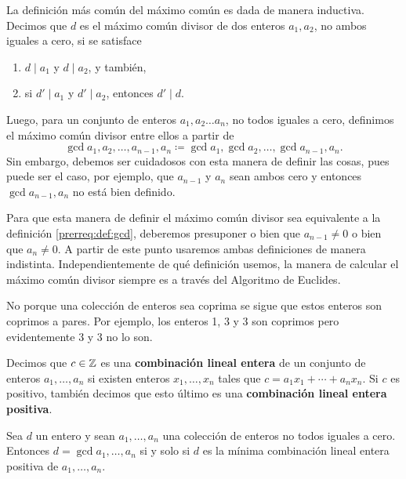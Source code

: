 La definición más común del máximo común es dada de manera inductiva. Decimos que $d$ es el máximo
común divisor de dos enteros $a_1, a_2$, no ambos iguales a cero, si se satisface
\begin{enumerate}
	\item $d \mid a_1$ y $d \mid a_2$, y también,
	\item si $d' \mid a_1$ y $d' \mid a_2$, entonces $d' \mid d$.
\end{enumerate}
Luego, para un conjunto de enteros $a_1, a_2 \ldots a_n$, no todos iguales a cero, definimos el máximo común
divisor entre ellos a partir de
\begin{equation*}
	\gcd{a_1, a_2, \ldots, a_{n-1}, a_n} \coloneq \gcd{a_1, \gcd{a_2, \ldots, \gcd{a_{n-1}, a_n}}}.
\end{equation*}
Sin embargo, debemos ser cuidadosos con esta manera de definir las cosas, pues puede ser el caso,
por ejemplo, que $a_{n-1}$ y $a_n$ sean ambos cero y entonces $\gcd{a_{n-1}, a_n}$ no está bien definido.

Para que esta manera de definir el máximo común divisor sea equivalente a la definición
\ref{prerreq:def:gcd}, deberemos presuponer o bien que $a_{n - 1} \neq 0$ o bien que $a_n \neq 0$. A
partir de este punto usaremos ambas definiciones de manera indistinta. Independientemente de qué
definición usemos, la manera de calcular el máximo común divisor siempre es a través del Algoritmo
de Euclides.

\begin{observation}
	No porque una colección de enteros sea coprima se sigue que estos enteros son coprimos a pares.
	Por ejemplo, los enteros 1, 3 y 3 son coprimos pero evidentemente 3 y 3 no lo son.
\end{observation}

\begin{definition}
	Decimos que $c \in \mathbb{Z}$ es una \textbf{combinación lineal entera} de un conjunto de enteros $a_1, \ldots,
	a_n$ si existen enteros $x_1, \ldots, x_n$ tales que $c = a_1x_1 + \cdots + a_nx_n$. Si $c$ es
	positivo, también decimos que esto último es una \textbf{combinación lineal entera positiva}.
\end{definition}

\begin{theorem}
	\label{prerreq:th:bezout}
	Sea $d$ un entero y sean $a_1, \ldots, a_n$ una colección de enteros no todos iguales a cero.
	Entonces $d = \gcd{a_1, \ldots, a_n}$ si y solo si $d$ es la mínima combinación lineal entera
	positiva de $a_1, \ldots, a_n$.
\end{theorem}

